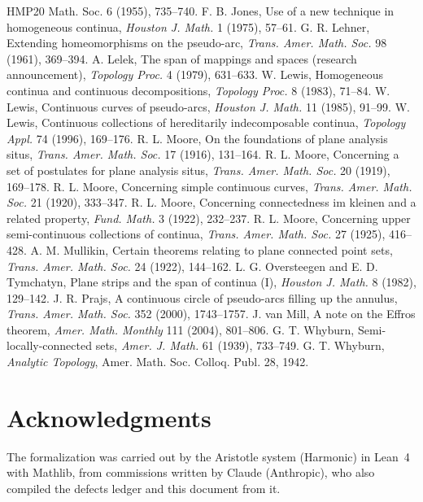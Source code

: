\documentclass[11pt]{article}
\newcounter{defect}
\begin{document}
\begin{thebibliography}{HMP20}
{  Math. Soc.} 6 (1955), 735--740.
 F. B. Jones, Use of a new technique in homogeneous continua, \emph{Houston J.
  Math.} 1 (1975), 57--61.
 G. R. Lehner, Extending homeomorphisms on the pseudo-arc, \emph{Trans. Amer.
  Math. Soc.} 98 (1961), 369--394.
 A. Lelek, The span of mappings and spaces (research announcement),
  \emph{Topology Proc.} 4 (1979), 631--633.
 W. Lewis, Homogeneous continua and continuous decompositions, \emph{Topology
  Proc.} 8 (1983), 71--84.
 W. Lewis, Continuous curves of pseudo-arcs, \emph{Houston J. Math.} 11 (1985),
  91--99.
 W. Lewis, Continuous collections of hereditarily indecomposable continua,
  \emph{Topology Appl.} 74 (1996), 169--176.
 R. L. Moore, On the foundations of plane analysis situs, \emph{Trans. Amer. Math.
  Soc.} 17 (1916), 131--164.
 R. L. Moore, Concerning a set of postulates for plane analysis situs,
  \emph{Trans. Amer. Math. Soc.} 20 (1919), 169--178.
 R. L. Moore, Concerning simple continuous curves, \emph{Trans. Amer. Math. Soc.}
  21 (1920), 333--347.
 R. L. Moore, Concerning connectedness im kleinen and a related property,
  \emph{Fund. Math.} 3 (1922), 232--237.
 R. L. Moore, Concerning upper semi-continuous collections of continua,
  \emph{Trans. Amer. Math. Soc.} 27 (1925), 416--428.
 A. M. Mullikin, Certain theorems relating to plane connected point sets,
  \emph{Trans. Amer. Math. Soc.} 24 (1922), 144--162.
 L. G. Oversteegen and E. D. Tymchatyn, Plane strips and the span of continua
  (I), \emph{Houston J. Math.} 8 (1982), 129--142.
 J. R. Prajs, A continuous circle of pseudo-arcs filling up the annulus,
  \emph{Trans. Amer. Math. Soc.} 352 (2000), 1743--1757.
 J. van Mill, A note on the Effros theorem, \emph{Amer. Math. Monthly} 111
  (2004), 801--806.
 G. T. Whyburn, Semi-locally-connected sets, \emph{Amer. J. Math.} 61 (1939),
  733--749.
 G. T. Whyburn, \emph{Analytic Topology}, Amer. Math. Soc. Colloq. Publ. 28,
  1942.
\end{thebibliography}

\section*{Acknowledgments}
The formalization was carried out by the Aristotle system (Harmonic) in Lean~4 with Mathlib, from
commissions written by Claude (Anthropic), who also compiled the defects ledger and this document
from it.
\end{document}
